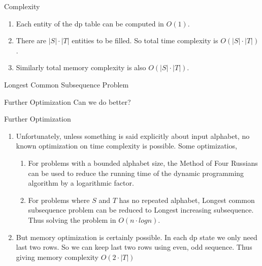 \documentclass{beamer}
\begin{document}


\begin{frame}{Complexity}
\begin{enumerate}
    \onslide\item<1-> Each entity of the dp table can be computed in $O(1)$.
    \onslide\item<2-> There are $|S|\cdot|T|$ entities to be filled. So total time complexity is $O( |S|\cdot |T| )$.
    \onslide\item<3-> Similarly total memory complexity is also $O( |S|\cdot |T| )$.
\end{enumerate}
\end{frame}

\begin{frame}{Longest Common Subsequence Problem}
\begin{block}{Further Optimization}
Can we do better?
\end{block}
\end{frame}

\begin{frame}{Further Optimization}
\begin{enumerate}
    \onslide\item<1-> Unfortunately, unless something is said explicitly about input alphabet, no known optimization on time complexity is possible. Some optimizatios,
    \begin{enumerate}
        \onslide\item<2->For problems with a bounded alphabet size, the Method of Four Russians can be used to reduce the running time of the dynamic programming algorithm by a logarithmic factor.
        \onslide\item<3->For problems where $S$ and $T$ has no repeated alphabet, Longest common subsequence problem can be reduced to Longest increasing subsequence. Thus solving the problem in $O(n\cdot logn)$.

    \end{enumerate}
    \onslide\item<4-> But memory optimization is certainly possible. In each dp state we only need last two rows. So we can keep last two rows using even, odd sequence. Thus giving memory complexity $O(2\cdot|T|)$ 
\end{enumerate}
\end{frame}
\end{document}
